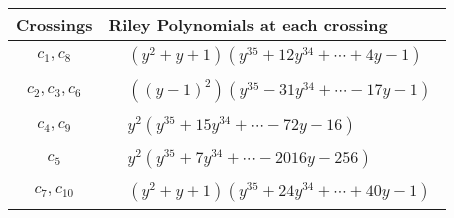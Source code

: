 \documentclass[1p]{elsarticle_modified}
\theoremstyle{definition}
\begin{document}
\begin{tabular}{m{50pt}|m{274pt}}
Crossings & \hspace{64pt}Riley Polynomials at each crossing \\
\hline $$\begin{aligned}c_{1},c_{8}\end{aligned}$$&$\begin{aligned}
&(y^2+y+1)(y^{35}+12 y^{34}+\cdots+4 y-1)
\end{aligned}$\\
\hline $$\begin{aligned}c_{2},c_{3},c_{6}\end{aligned}$$&$\begin{aligned}
&((y-1)^2)(y^{35}-31 y^{34}+\cdots-17 y-1)
\end{aligned}$\\
\hline $$\begin{aligned}c_{4},c_{9}\end{aligned}$$&$\begin{aligned}
&y^2(y^{35}+15 y^{34}+\cdots-72 y-16)
\end{aligned}$\\
\hline $$\begin{aligned}c_{5}\end{aligned}$$&$\begin{aligned}
&y^2(y^{35}+7 y^{34}+\cdots-2016 y-256)
\end{aligned}$\\
\hline $$\begin{aligned}c_{7},c_{10}\end{aligned}$$&$\begin{aligned}
&(y^2+y+1)(y^{35}+24 y^{34}+\cdots+40 y-1)
\end{aligned}$\\
\hline
\end{tabular}
\vskip 2pc
\end{document}
